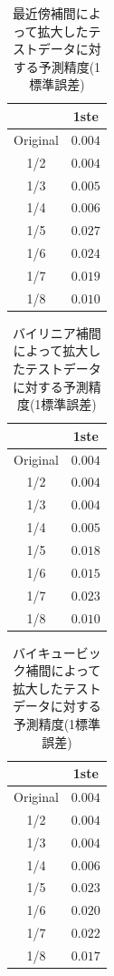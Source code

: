 \documentclass[a4j, 11pt]{jreport}
\begin{document}
\begin{table}[H]
  \centering
	\caption{最近傍補間によって拡大したテストデータに対する予測精度(1標準誤差)}
  \begin{tabular}{|c|c|}
		\hline
    & 1ste \\ \hline
    Original & $0.004$ \\ \hline
    1/2 & $0.004$ \\ \hline
    1/3 & $0.005$ \\ \hline
    1/4 & $0.006$ \\ \hline
    1/5 & $0.027$ \\ \hline
    1/6 & $0.024$ \\ \hline
    1/7 & $0.019$ \\ \hline
    1/8 & $0.010$ \\ \hline
  \end{tabular}
  \label{tb:accs_4_2_nearest_1ste}
\end{table}

\begin{table}[H]
  \centering
	\caption{バイリニア補間によって拡大したテストデータに対する予測精度(1標準誤差)}
  \begin{tabular}{|c|c|}
		\hline
    & 1ste \\ \hline
    Original & $0.004$ \\ \hline
    1/2 & $0.004$ \\ \hline
    1/3 & $0.004$ \\ \hline
    1/4 & $0.005$ \\ \hline
    1/5 & $0.018$ \\ \hline
    1/6 & $0.015$ \\ \hline
    1/7 & $0.023$ \\ \hline
    1/8 & $0.010$ \\ \hline
  \end{tabular}
  \label{tb:accs_4_2_linear_1ste}
\end{table}

\begin{table}[H]
  \centering
	\caption{バイキュービック補間によって拡大したテストデータに対する予測精度(1標準誤差)}
  \begin{tabular}{|c|c|}
		\hline
    & 1ste \\ \hline
    Original & $0.004$ \\ \hline
    1/2 & $0.004$ \\ \hline
    1/3 & $0.004$ \\ \hline
    1/4 & $0.006$ \\ \hline
    1/5 & $0.023$ \\ \hline
    1/6 & $0.020$ \\ \hline
    1/7 & $0.022$ \\ \hline
    1/8 & $0.017$ \\ \hline
  \end{tabular}
  \label{tb:accs_4_2_cubic_1ste}
\end{table}
\end{document}
